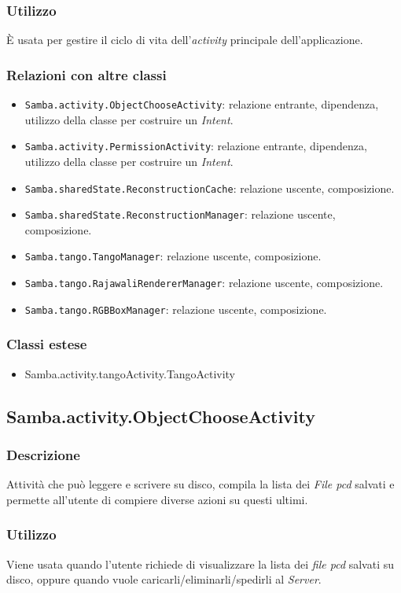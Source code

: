 \subsubsection{Utilizzo}
È usata per gestire il ciclo di vita dell'\emph{activity} principale dell'applicazione.
\subsubsection{Relazioni con altre classi}
\begin{itemize}
	\item \texttt{Samba.activity.ObjectChooseActivity}: relazione entrante, dipendenza, utilizzo della classe per costruire un \emph{Intent}.
	\item \texttt{Samba.activity.PermissionActivity}: relazione entrante, dipendenza, utilizzo della classe per costruire un \emph{Intent}.
	\item \texttt{Samba.sharedState.ReconstructionCache}: relazione uscente, composizione.
	\item \texttt{Samba.sharedState.ReconstructionManager}: relazione uscente, composizione.	
	\item \texttt{Samba.tango.TangoManager}: relazione uscente, composizione.
	\item \texttt{Samba.tango.RajawaliRendererManager}: relazione uscente, composizione.
	\item \texttt{Samba.tango.RGBBoxManager}: relazione uscente, composizione.
\end{itemize}
\subsubsection{Classi estese}
\begin{itemize}
	\item Samba.activity.tangoActivity.TangoActivity
\end{itemize}

\subsection{Samba.activity.ObjectChooseActivity}
\subsubsection{Descrizione}
Attività che può leggere e scrivere su disco, compila la lista dei \emph{File pcd} salvati e permette all'utente di compiere diverse azioni su questi ultimi.
\subsubsection{Utilizzo}
Viene usata quando l'utente richiede di visualizzare la lista dei \emph{file pcd} salvati su disco, oppure quando vuole caricarli/eliminarli/spedirli al \emph{Server}.
